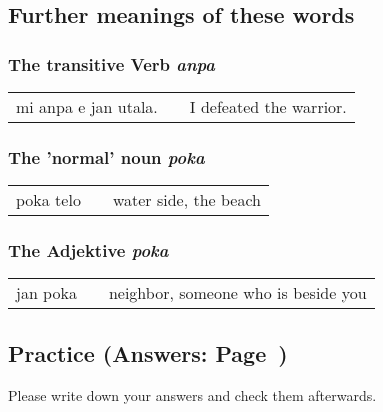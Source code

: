 %
%
%
\subsection*{Further meanings of these words}
%
%
%
\subsubsection*{The transitive Verb \textit{anpa}}
%

\begin{supertabular}{p{5,5cm}|ll}
mi anpa e jan utala. && I defeated the warrior. \\
\end{supertabular} 

%
\subsubsection*{The 'normal' noun \textit{poka}}
%

\begin{supertabular}{p{5,5cm}|ll}
poka telo && water side, the beach \\
\end{supertabular} 

%
\subsubsection*{The Adjektive \textit{poka}}
%

\begin{supertabular}{p{5,5cm}|ll}
jan poka && neighbor, someone who is beside you \\
\end{supertabular} 

%
%
%
\newpage
%
\subsection*{Practice (Answers: Page~\pageref{'other_prepositions'})}
%
Please write down your answers and check them afterwards. 

